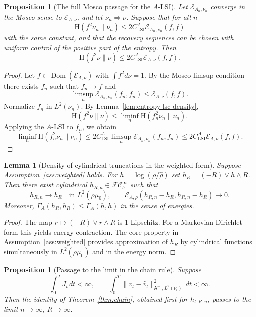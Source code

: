 \documentclass{article}
\newtheorem{lemma}[theorem]{Lemma}
\newtheorem{proposition}[theorem]{Proposition}
\newcommand{\Ent}{\mathrm H}
\newcommand{\Asf}{\mathsf A}
\newcommand{\Dom}{\operatorname{Dom}}
\newcommand{\FC}{\mathcal{FC}_b^\infty}
\begin{document}
\begin{proposition}[The full Mosco passage for the \(A\)-LSI]
\label{prop:full-mosco-lsi}
Let \(\mathcal E_{A_n,\nu_n}\) converge in the Mosco sense to
\(\mathcal E_{A,\nu}\), and let \(\nu_n\Rightarrow\nu\). Suppose that for all
\(n\)
\[
        \Ent(f^2\nu_n\|\nu_n)
        \le
        2C_{\mathrm{LSI}}^A\mathcal E_{A_n,\nu_n}(f,f)
\]
with the same constant, and that the recovery sequences can be chosen
with uniform control of the positive part of the entropy. Then
\[
        \Ent(f^2\nu\|\nu)
        \le
        2C_{\mathrm{LSI}}^A\mathcal E_{A,\nu}(f,f).
\]
\end{proposition}

\begin{proof}
Let \(f\in\Dom(\mathcal E_{A,\nu})\) with \(\int f^2d\nu=1\). By the Mosco
limsup condition there exists \(f_n\) such that \(f_n\to f\) and
\[
        \limsup_n\mathcal E_{A_n,\nu_n}(f_n,f_n)
        \le
        \mathcal E_{A,\nu}(f,f).
\]
Normalize \(f_n\) in \(L^2(\nu_n)\). By
Lemma~\ref{lem:entropy-lsc-density},
\[
        \Ent(f^2\nu\|\nu)
        \le
        \liminf_n\Ent(f_n^2\nu_n\|\nu_n).
\]
Applying the \(A\)-LSI to \(f_n\), we obtain
\[
        \liminf_n\Ent(f_n^2\nu_n\|\nu_n)
        \le
        2C_{\mathrm{LSI}}^A
        \limsup_n\mathcal E_{A_n,\nu_n}(f_n,f_n)
        \le
        2C_{\mathrm{LSI}}^A\mathcal E_{A,\nu}(f,f).
\]
\end{proof}

\begin{lemma}[Density of cylindrical truncations in the weighted form]
\label{lem:truncation-core}
Suppose Assumption~\ref{ass:weighted} holds. For
\(h=\log(\rho/\hat\rho)\) set \(h_R=(-R)\vee h\wedge R\). Then there exist
cylindrical \(h_{R,n}\in\FC\) such that
\[
        h_{R,n}\to h_R \quad\text{in }L^2(\rho\mu_0),
        \qquad
        \mathcal E_{A,\rho}(h_{R,n}-h_R,h_{R,n}-h_R)\to0 .
\]
Moreover, \(\Gamma_A(h_R,h_R)\le \Gamma_A(h,h)\) in the sense of energies.
\end{lemma}

\begin{proof}
The map \(r\mapsto (-R)\vee r\wedge R\) is \(1\)-Lipschitz. For a Markovian
Dirichlet form this yields energy contraction. The core property in
Assumption~\ref{ass:weighted} provides approximation of \(h_R\) by cylindrical
functions simultaneously in \(L^2(\rho\mu_0)\) and in the energy norm.
\end{proof}

\begin{proposition}[Passage to the limit in the chain rule]
\label{prop:chain-limit}
Suppose
\[
        \int_0^T J_t\,dt<\infty,\qquad
        \int_0^T\|v_t-\hat v_t\|_{\Asf^{-1},L^2(\nu_t)}^2\,dt<\infty .
\]
Then the identity of Theorem~\ref{thm:chain}, obtained first for
\(h_{t,R,n}\), passes to the limit \(n\to\infty\), \(R\to\infty\).
\end{proposition}
\end{document}

